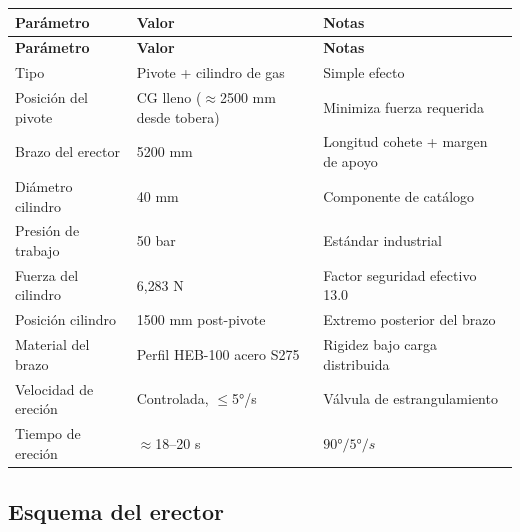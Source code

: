 \documentclass[11pt, a4paper]{article}
\begin{document}
\begin{longtable}{L{5.5cm} C{3cm} L{5cm}}
  \color{white}\textbf{Par\'{a}metro} &
  \color{white}\textbf{Valor} &
  \color{white}\textbf{Notas} \\
  \endfirsthead
  \color{white}\textbf{Par\'{a}metro} &
  \color{white}\textbf{Valor} &
  \color{white}\textbf{Notas} \\
  \endhead
  Tipo                        & Pivote + cilindro de gas  & Simple efecto \\
  Posici\'{o}n del pivote     & CG lleno ($\approx$2500 mm desde tobera) & Minimiza fuerza requerida \\
  Brazo del erector           & 5200 mm                   & Longitud cohete + margen de apoyo \\
  Di\'{a}metro cilindro       & 40 mm                     & Componente de cat\'{a}logo \\
  Presi\'{o}n de trabajo      & 50 bar                    & Est\'{a}ndar industrial \\
  Fuerza del cilindro         & 6{,}283 N                 & Factor seguridad efectivo 13.0 \\
  Posici\'{o}n cilindro       & 1500 mm post-pivote       & Extremo posterior del brazo \\
  Material del brazo          & Perfil HEB-100 acero S275 & Rigidez bajo carga distribuida \\
  Velocidad de ereci\'{o}n    & Controlada, $\leq$5°/s    & V\'{a}lvula de estrangulamiento \\
  Tiempo de ereci\'{o}n       & $\approx$18--20 s         & $90° / 5°/s$ \\
\end{longtable}

\subsection{Esquema del erector}
\end{document}
